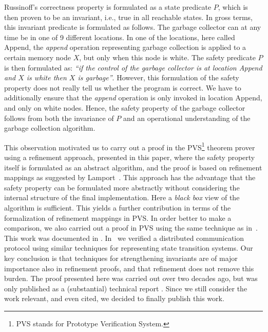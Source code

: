 Russinoff's correctness property is formulated as a  state predicate $P$, which
is then proven to be an invariant, i.e., true in all reachable  states.
In gross  terms, 
this invariant predicate is formulated as  follows.  The garbage collector
can at 
any time be in one of 9 different locations.  In one of the locations,
here  called {\sc  Append},  the {\em append} operation  representing
garbage collection is applied to a certain  memory node $X$, but only
when this node is white. The safety  predicate  $P$  is  then formulated  as:
%
{\em ``if the control of the garbage collector is at 
location {\sc Append} and
$X$ is white then $X$ is garbage''}.
%
%
However, this formulation of   the  safety property does not really  tell us
whether the  program is correct.  We 
have to additionally ensure that  the {\em append} operation is
only invoked in location {\sc Append}, and only on white nodes.  Hence,
the safety property of the garbage collector follows from both the
invariance of $P$ and an operational understanding of the
garbage collection algorithm.  

This  observation motivated  us  to  carry  out a   proof  in the PVS\footnote{PVS stands for Prototype Verification System.} theorem prover
\cite{pvs-url} using   a  refinement approach,  presented in this paper,
where   the safety property  itself  is formulated  as an  abstract algorithm, and
the proof  is  based  on refinement  mappings  as suggested  by
Lamport~\cite{TLA:TOPLAS94}.  This  approach   has the advantage  that  the
safety property can  be formulated more abstractly without considering
the internal structure of the final implementation.  Here a {\em black
  box} view   of the  algorithm is   sufficient.  This yields a
further contribution in terms of the 
formalization of refinement mappings in PVS.
In  order   better to make  a
comparison, we also carried out a proof in PVS using the same
technique   as  in~\cite{Rus:GC}.  This    work   was documented  in
\cite{havelund-pvs-gc-99}.
%
In~\cite{HS:BRP}  we verified  a  distributed communication  protocol
using similar techniques for representing  state transition systems. 
Our  key conclusion  is  that  techniques for
strengthening invariants are  of major importance also in refinement
proofs, and that refinement does not remove this burden.  
%
The proof presented here was carried out over two decades ago, but
was only published as a (substantial) technical report \cite{havelund-shankar-gc-report-97}. 
Since we still consider the work relevant, and even
cited, we decided to finally publish this work.

